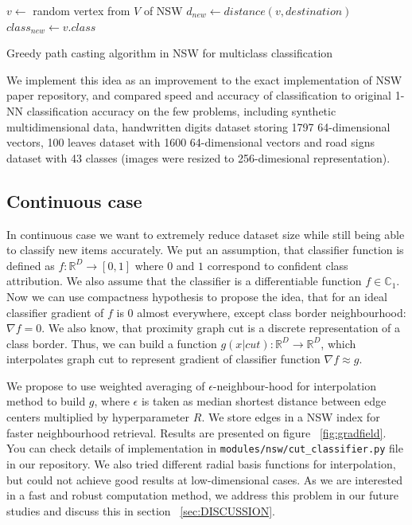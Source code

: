 \begin{algorithm}
\label{alg:the_alg}
\SetAlgoLined
{}
 $v \gets$ random vertex from $V$ of NSW\;
 $d_{new} \gets distance(v, destination)$\;
 $class_{new} \gets v.class$\;
 \;
 \caption{Greedy path casting algorithm in NSW for multiclass classification}
\end{algorithm}

We implement this idea as an improvement to the exact implementation of NSW paper repository, and compared speed and accuracy of classification to original 1-NN classification accuracy on the few problems, including synthetic multidimensional data, handwritten digits dataset \cite{mnist} storing 1797 64-dimensional vectors, 100 leaves dataset with 1600 64-dimensional vectors \cite{100leaves} and road signs dataset \cite{signsdataset} with 43 classes (images were resized to 256-dimesional representation).


\subsection{Continuous case}

In continuous case we want to extremely reduce dataset size while still being able to classify new items accurately. We put an assumption, that classifier function is defined as $f:\mathbb{R}^D \rightarrow [0, 1]$ where $0$ and $1$ correspond to confident class attribution. We also assume that the classifier is a differentiable function $f\in\mathbb{C}_1$.
Now we can use compactness hypothesis to propose the idea, that for an ideal classifier gradient of $f$ is 0 almost everywhere, except class border neighbourhood: $\nabla f = 0$. We also know, that proximity graph cut is a discrete representation of a class border. Thus, we can build a function $g(x|cut):\mathbb{R}^D\rightarrow\mathbb{R}^D$, which interpolates graph cut to represent gradient of classifier function $\nabla f \approx g$.

We propose to use weighted averaging of $\epsilon$-neighbour-hood for interpolation method to build $g$, where $\epsilon$ is taken as median shortest distance between edge centers multiplied by hyperparameter $R$. We store edges in a NSW index for faster neighbourhood retrieval. Results are presented on figure ~\ref{fig:gradfield}. You can check details of implementation in \texttt{modules/nsw/cut\_classifier.py} file in our repository. We also tried different radial basis functions for interpolation, but could not achieve good results at low-dimensional cases. As we are interested in a fast and robust computation method, we address this problem in our future studies and discuss this in section ~\ref{sec:DISCUSSION}.

